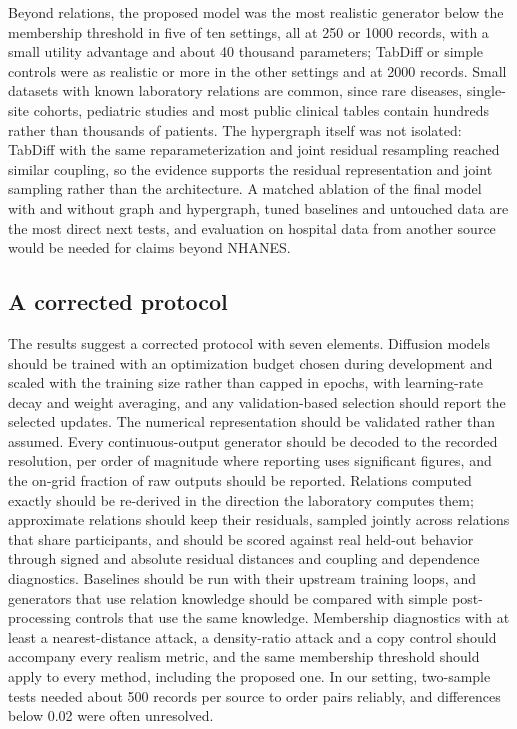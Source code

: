 \documentclass[pdflatex,referee]{sn-jnl}%
\begin{document}
Beyond relations, the proposed model was the most realistic generator below the membership threshold in five of ten settings, all at 250 or 1000 records, with a small utility advantage and about 40 thousand parameters; TabDiff or simple controls were as realistic or more in the other settings and at 2000 records. Small datasets with known laboratory relations are common, since rare diseases, single-site cohorts, pediatric studies and most public clinical tables contain hundreds rather than thousands of patients. The hypergraph itself was not isolated: TabDiff with the same reparameterization and joint residual resampling reached similar coupling, so the evidence supports the residual representation and joint sampling rather than the architecture. A matched ablation of the final model with and without graph and hypergraph, tuned baselines and untouched data are the most direct next tests, and evaluation on hospital data from another source would be needed for claims beyond NHANES.

\subsection*{A corrected protocol}

The results suggest a corrected protocol with seven elements. Diffusion models should be trained with an optimization budget chosen during development and scaled with the training size rather than capped in epochs, with learning-rate decay and weight averaging, and any validation-based selection should report the selected updates. The numerical representation should be validated rather than assumed. Every continuous-output generator should be decoded to the recorded resolution, per order of magnitude where reporting uses significant figures, and the on-grid fraction of raw outputs should be reported. Relations computed exactly should be re-derived in the direction the laboratory computes them; approximate relations should keep their residuals, sampled jointly across relations that share participants, and should be scored against real held-out behavior through signed and absolute residual distances and coupling and dependence diagnostics. Baselines should be run with their upstream training loops, and generators that use relation knowledge should be compared with simple post-processing controls that use the same knowledge. Membership diagnostics with at least a nearest-distance attack, a density-ratio attack and a copy control should accompany every realism metric, and the same membership threshold should apply to every method, including the proposed one. In our setting, two-sample tests needed about 500 records per source to order pairs reliably, and differences below 0.02 were often unresolved.
\end{document}
